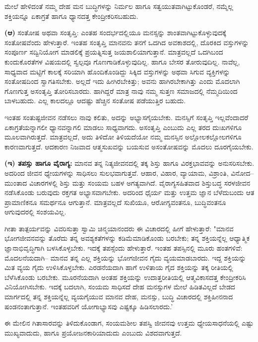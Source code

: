 ಮೇಲೆ ಹೇಳಿದಂತೆ ನಮ್ಮ ದೇಹ ಮನ ಬುದ್ಧಿಗಳನ್ನು ನಿರ್ಮಲ ಹಾಗೂ ಸತ್ವಯುತವಾಗಿಟ್ಟುಕೊಂಡರೆ, ನಮ್ಮೆಲ್ಲ ಶಕ್ತಿಯನ್ನೂ ಏಕಾಗ್ರತೆ ಹಾಗೂ ಧ್ಯಾನದತ್ತ ಕೇಂದ್ರೀಕರಿಸಬಹುದು.

\textbf{(ಆ)} ಸಂತೋಷ ಅಥವಾ ಸಂತೃಪ್ತಿ: ಎಂತಹ ಸಂದರ್ಭದಲ್ಲಿಯೂ ಮನಸ್ಸನ್ನು ಶಾಂತವಾಗಿಟ್ಟುಕೊಳ್ಳುವುದಕ್ಕೆ ಸಂತೋಷವೆಂದು ಹೇಳುತ್ತಾರೆ. ಇಂತಹ ಸಂತೃಪ್ತಿ ಮಾನವನು ತನಗೆ ಒದಗಿದ ಅವಕಾಶದಲ್ಲಿ, ದೊರಕಿದ ವಸ್ತುಗಳನ್ನು ಸಂಪೂರ್ಣ ಸದ್ವಿನಿಯೋಗ ಮಾಡಲಿಕ್ಕೆ ಪ್ರಯತ್ನಿಸುತ್ತ ಜಯಶಾಲಿಯಾಗುತ್ತಾನೆ. ಮಾತ್ರವಲ್ಲದೆ ಒದಗಿಬಂದ ಕುಂದುಕೊರತೆಗಳ ವಿಷಯದಲ್ಲಿ ಸ್ವಲ್ಪವೂ ಗೊಣಗಾಡಿಕೊಳ್ಳುವುದಿಲ್ಲ. ಹಾಗೂ ಬೇಸರ ತೋರುವುದಿಲ್ಲ. ನಾವೆಲ್ಲ, ಸಾಧ್ಯವಾದ ಮಟ್ಟಿಗೆ ಕಾಲಕ್ಕೆ ಸರಿಯಾಗಿ ಹೊಂದಿಕೊಂಡಿದ್ದು ಸಿಕ್ಕಿದ ವಸ್ತುಗಳನ್ನು ಅಥವಾ ಸಿಗುವ ವ್ಯಕ್ತಿಗಳನ್ನು ಸಂತೋಷದಿಂದ ಸ್ವಾಗತಿಸಬೇಕು. ಅಲ್ಲದೆ ಇದು ಹೀಗಿರಬೇಕಿತ್ತು; ಅವನು ಹಾಗಿರಬೇಕಾಗಿತ್ತು ಎಂದು ಮೊದಲಾಗಿ ಗೊಣಗುತ್ತ ಅಸಂತೃಪ್ತಿ ತೋರಿಸಬಾರದು. ಹಾಗಿದ್ದರೆ ಮಾತ್ರ ನಾವು ನಮ್ಮ ಸುತ್ತಣ ಸಮಾಜದಲ್ಲಿ ನೆಮ್ಮದಿಯಿಂದ ಬಾಳಬಹುದು. ಎಲ್ಲ ಕಾಲದಲ್ಲೂ ಆದಷ್ಟು ಹೆಚ್ಚಿನ ಸಂತೋಷ ಪಡೆಯುತ್ತಿರ ಬಹುದು.

ಇಂತಹ ಸಂತುಷ್ಟಜೀವನ ನಡೆಸಲು ನಾವು ಕಲಿತು, ಅದನ್ನು ಅಭ್ಯಾಸಗೈಯಬೇಕು. ಮನಸ್ಸಿಗೆ ಸಂತೃಪ್ತಿ ಇಲ್ಲವೆಂದಾದರೆ ಏಕಾಗ್ರತೆಯನ್ನಾಗಲೀ ಧ್ಯಾನವನ್ನಾಗಲಿ ಮಾಡಲು ಸಾಧ್ಯವಾಗದು. ಅಸಂತೃಪ್ತಿ ಎಂಬುದು ಎಲ್ಲ ತರದ ದುಃಖಗಳಿಗೂ ಮೂಲವಾಗಿರುತ್ತದೆ. ಮಾತ್ರವಲ್ಲದೆ, ಅದು ತಿಳಿದೋ ತಿಳಿಯದೆಯೋ ನಮ್ಮ ಮನಸ್ಸಿನ ಅಲ್ಲೋಲಕಲ್ಲೋಲಗಳಿಗೂ ಕಾರಣವಾಗುತ್ತದೆ. ಆದಕಾರಣ ನಿಜವಾದ ಆತ್ಮಸುಖವನ್ನು ಬಯಸುವ ಅಸಂತೋಷವನ್ನು ಮೊದಲು ದೂರಗೈಯಬೇಕು.

\textbf{(ಇ) ತಪಸ್ಸು ಹಾಗೂ ವೈರಾಗ್ಯ:} ಮಾನವ ತನ್ನ ನಿತ್ಯಜೀವನದಲ್ಲಿ ತಕ್ಕ ಶಿಸ್ತು ಹಾಗೂ ವಿರಕ್ತಭಾವವನ್ನು ಅನುಸರಿಸಬೇಕು. ಅದರಿಂದ ಜೀವನ ಧ್ಯೇಯಗಳನ್ನು ಸಾಧಿಸಲು ಸುಲಭವಾಗುತ್ತವೆ. ಆಹಾರ, ವಿಹಾರ, ವ್ಯಾಯಾಮ, ವಿಶ್ರಾಂತಿ, ವಿನೋದ–ಮುಂತಾದ ವಿಚಾರಗಳಲ್ಲಿ ಶಿಸ್ತು ಮತ್ತು ಸಂಯಮ ಬಹಳ ಅಗತ್ಯವಾಗಿದೆ. ವೈರಾಗ್ಯಸಹಿತವಾದ ಶಿಸ್ತುಬದ್ಧ ಸರಳಜೀವನ ನಡೆಸಿಕೊಂಡು ಬರುವುದು ರಕ್ತಗತ ಅಭ್ಯಾಸವಾಗಬೇಕು. ಅದರಿಂದ ಧೈರ್ಯ ಮತ್ತು ಉತ್ತಮ ಜ್ಞಾನ ಬೆಳೆದುಬಂದು ಆತ ಪ್ರಾಮಾಣಿಕನೂ ಸಮರ್ಥನೂ ಆಗುತ್ತಾನೆ. ಮಾತ್ರವಲ್ಲದೆ ಸುಖಿಯೂ, ಆರೋಗ್ಯವಂತನೂ, ಬುದ್ಧಿವಂತನೂ ಆಗುವುದರಲ್ಲಿ ಸಂಶಯವಿಲ್ಲ.

ಗೀತಾ ತಾತ್ಪರ್ಯವನ್ನು ವಿವರಿಸುತ್ತಾ ಸ್ವಾಮಿ ಚಿನ್ಮಯಾನಂದರು ಈ ವಿಚಾರದಲ್ಲಿ ಹೀಗೆ ಹೇಳುತ್ತಾರೆ: "ಮಾನವ ಭೋಗಜೀವನವನ್ನು ತೊರೆದು ತನ್ನ ಅವಶ್ಯಕತೆಗಳನ್ನು ಕಡಿಮೆಮಾಡಿಕೊಂಡು ಬರಬೇಕು; ತನ್ನ ಶಕ್ತಿಯನ್ನೆಲ್ಲ ಆಧ್ಯಾತ್ಮಿಕ ಜ್ಞಾನಾಭಿವೃದ್ಧಿಗಾಗಿ ಬಳಸಿಕೊಳ್ಳಬೇಕು. ಇದಕ್ಕೆ ತಪಸ್ಸೆಂದು ಹೇಳುತ್ತಾರೆ. ಇಂತಹ ತಪಸ್ಸಿನಲ್ಲಿ ಮೂರು ಹಂತಗಳಿವೆ: ಮೊದಲನೆಯದಾಗಿ– ಮಾನವ ತನ್ನ ಎಲ್ಲ ಶಕ್ತಿಯನ್ನು ಭೋಗಜೀವನ ಗೈದು ವ್ಯಯಮಾಡಬಾರದು. ಇದ್ದ ಶಕ್ತಿಯನ್ನು ಮಿತ ವ್ಯಯ ಗೈದು ಉಳಿಸಿಕೊಳ್ಳಬೇಕು. ಎರಡನೆಯದಾಗಿ ಹಾಗೆ ಉಳಿತಾಯ ಗೈದ ಶಕ್ತಿಯನ್ನು ತಕ್ಕ ರೀತಿಯಲ್ಲಿ ಬೆಳೆಸಿಕೊಂಡು ಬರಬೇಕು. ಮೂರನೆಯದಾಗಿ ಅಂತಹ ಶಕ್ತಿಯನ್ನು ಉದಾತ್ತರೀತಿಯಲ್ಲಿ ಆತ್ಮವಿಕಾಸದತ್ತ ಕೇಂದ್ರೀಕರಿಸಿ ವಿನಿಯೋಗಿಸಬೇಕು. ಇದಕ್ಕೆ ಬದಲಾಗಿ, ಸಂಯಮ ಸಾಧಿಸದೆ ದೇಹ ಮನಸ್ಸುಗಳ ಮೇಲೆ ಹಿಡಿತವಿಲ್ಲದೆ ಬೇಡದ ಮಾರ್ಗದಲ್ಲಿ ತನ್ನ ಶಕ್ತಿಯನ್ನೆಲ್ಲ ವ್ಯಯಗೈಯುವ ಮಾನವ ದೇಹ, ಮನಸ್ಸು, ಬುದ್ಧಿ ವಿಚಾರದಲ್ಲಿ ಶಕ್ತಿಹೀನನಾದ ಷಂಡನಂತಾಗುತ್ತಾನೆ. ಇಂತಹವರಿಗೆ ಯೋಗಾಭ್ಯಾಸವು ಎಷ್ಟಕ್ಕೂ ಹಿಡಿಸಲಾರದು.'

ಈ ಮೇಲಿನ ಗಿತಾಸಾರವನ್ನು ತಿಳಿದುಕೊಂಡಾಗ, ಸಂಯಮಶೀಲ ತಪಸ್ವಿ ಜೀವನವು ಉತ್ತಮ ಧ್ಯೇಯಸಾಧನೆಯಲ್ಲಿ ಎಷ್ಟು ಮುಖ್ಯವಾದುದು, ಹಾಗೂ ಪ್ರಯೋಜನಕಾರಿಯಾದುದು ಎಂಬುದು ವಿಶದವಾಗುತ್ತದೆ.

